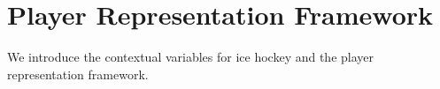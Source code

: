 \documentclass{article}
\newcommand{\latentvariables}{\mathbf{z}}
\newcommand{\hiddenstate}{\mathbf{h}}
\newcommand{\state}{\mathbf{s}}
\newcommand{\action}{\mathbf{a}}
\newcommand{\player}{pl}
\begin{document}



\section{Player Representation Framework}
We introduce the contextual variables for ice hockey and the player representation framework.
\end{document}
